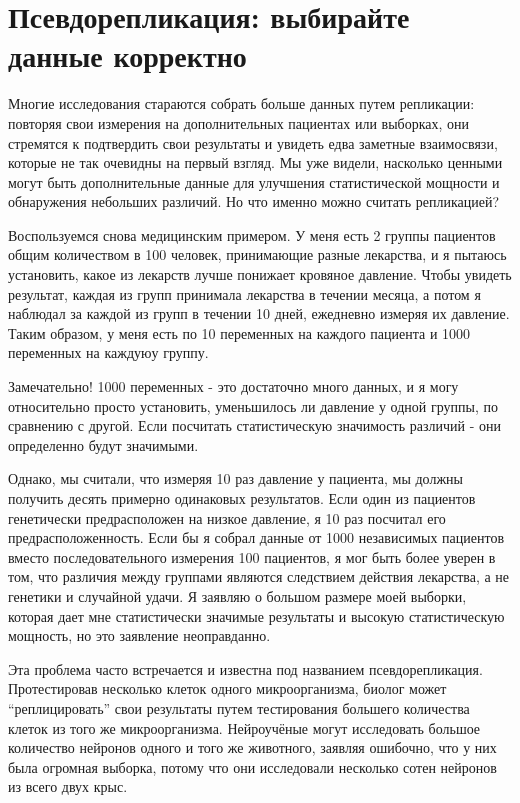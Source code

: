 \chapter{Псевдорепликация: выбирайте данные корректно}
\label{chp4}

Многие исследования стараются собрать больше данных путем репликации: повторяя свои измерения на дополнительных пациентах или выборках, они стремятся к подтвердить свои результаты и увидеть едва заметные взаимосвязи, которые не так очевидны на первый взгляд. Мы уже видели, насколько ценными могут быть дополнительные данные для улучшения статистической мощности и обнаружения небольших различий. Но что именно можно считать репликацией?

Воспользуемся снова медицинским примером. У меня есть 2 группы пациентов общим количеством в 100 человек, принимающие разные лекарства, и я пытаюсь установить, какое из лекарств лучше понижает кровяное давление. Чтобы увидеть результат, каждая из групп принимала лекарства в течении месяца, а потом я наблюдал за каждой из групп в течении 10 дней, ежедневно измеряя их давление. Таким образом, у меня есть по 10 переменных на каждого пациента и 1000 переменных на каждуюу группу. 

Замечательно! 1000 переменных - это достаточно много данных, и я могу относительно просто установить, уменьшилось ли давление у одной группы, по сравнению с другой. Если посчитать статистическую значимость различий - они определенно будут значимыми.

Однако, мы считали, что измеряя 10 раз давление у пациента, мы должны получить десять примерно одинаковых результатов. Если один из пациентов генетически предрасположен на низкое давление, я 10 раз посчитал его предрасположенность. Если бы я собрал данные от 1000 независимых пациентов вместо последовательного измерения 100 пациентов, я мог быть более уверен в том, что различия между группами являются следствием действия лекарства, а не генетики и случайной удачи. Я заявляю о большом размере моей выборки, которая дает мне статистически значимые результаты и высокую статистическую мощность, но это заявление неоправданно.  

Эта проблема часто встречается и известна под названием псевдорепликация\cite{lazic_problem_2010}. Протестировав несколько клеток одного микроорганизма, биолог может ``реплицировать'' свои результаты путем тестирования большего количества клеток из того же микроорганизма. Нейроучёные могут исследовать большое количество нейронов одного и того же животного, заявляя ошибочно, что у них была огромная выборка, потому что они исследовали несколько сотен нейронов из всего двух крыс.

